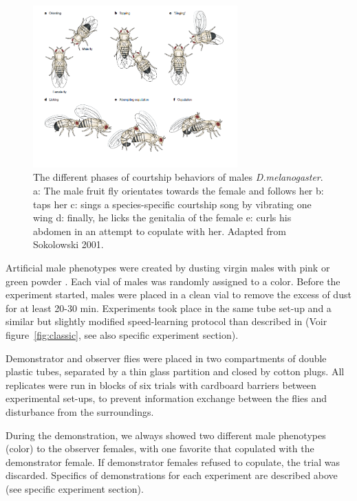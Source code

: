 \documentclass[a4paper, 12pt]{article}
\begin{document}
		\begin{figure}
		\centering
		\includegraphics[width=0.7\textwidth]{images/courtcomp}
		\caption{The different phases of courtship behaviors of males \textit{D.melanogaster}.\\
			a: The male fruit fly orientates towards the female and follows her
			b: taps her 
			c: sings a species-specific courtship song by vibrating one wing
			d: finally, he licks the genitalia of the female 
			e: curls his abdomen in an attempt to copulate with her.
			Adapted from Sokolowski 2001.}
		\label{fig:court}
	\end{figure}
	Artificial male phenotypes were created by dusting virgin males with pink or green powder \parencite{mery_public_2009}. Each vial of males was randomly assigned to a color. Before the experiment started, males were placed in a clean vial to remove the excess of dust for at least 20-30 min. Experiments took place in the same tube set-up and a similar but slightly modified speed-learning protocol than described in \textcite{dagaeff_drosophila_2016} (Voir figure~\ref{fig:classic}, see also specific experiment section).
		

	Demonstrator and observer flies were placed in two compartments of double plastic tubes, separated by a thin glass partition and closed by cotton plugs. All replicates were run in blocks of six trials with cardboard barriers between experimental set-ups, to prevent information exchange between the flies and disturbance from the surroundings. 
	
	During the demonstration, we always showed two different male phenotypes (color) to the observer females, with one favorite that copulated with the demonstrator female. If demonstrator females refused to copulate, the trial was discarded. Specifics of demonstrations for each experiment are described above (see specific experiment section).
	
\end{document}
